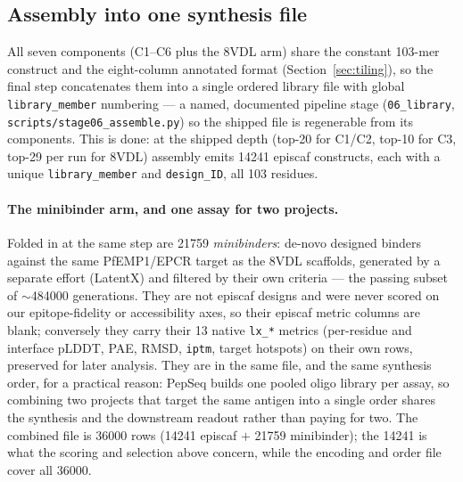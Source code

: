 \subsection{Assembly into one synthesis file}\label{sec:assembly}
All seven components (C1--C6 plus the 8VDL arm) share the constant 103-mer construct and the
eight-column annotated format (Section~\ref{sec:tiling}), so the final step concatenates them into a
single ordered library file with global \texttt{library\_member} numbering --- a named, documented
pipeline stage (\texttt{06\_library}, \texttt{scripts/stage06\_assemble.py}) so the shipped file is
regenerable from its components. This is done: at the shipped depth (top-\num{20} for C1/C2,
top-\num{10} for C3, top-\num{29} per run for 8VDL) assembly emits \num{14241} episcaf constructs, each with a unique
\texttt{library\_member} and \texttt{design\_ID}, all \num{103} residues.

\paragraph{The minibinder arm, and one assay for two projects.} Folded in at the same step are
\num{21759} \emph{minibinders}: de-novo designed binders against the same PfEMP1/EPCR target as the 8VDL
scaffolds, generated by a separate effort (LatentX) and filtered by their own criteria --- the passing
subset of $\sim$\num{484000} generations. They are not episcaf designs and were never scored on our
epitope-fidelity or accessibility axes, so their episcaf metric columns are blank; conversely they carry
their \num{13} native \texttt{lx\_*} metrics (per-residue and interface pLDDT, PAE, RMSD, \texttt{iptm},
target hotspots) on their own rows, preserved for later analysis. They are in the same file, and the same
synthesis order, for a practical reason: PepSeq builds one pooled oligo library per assay, so combining
two projects that target the same antigen into a single order shares the synthesis and the downstream
readout rather than paying for two. The combined file is \num{36000} rows (\num{14241} episcaf
$+$ \num{21759} minibinder); the \num{14241} is what the scoring and selection above concern, while the
encoding and order file cover all \num{36000}.

